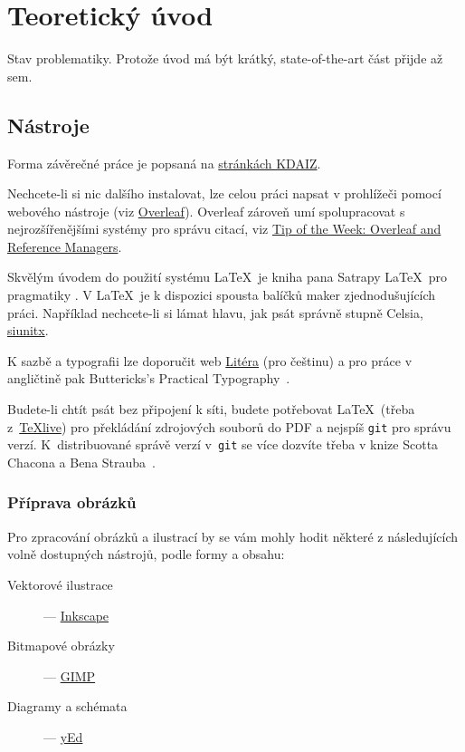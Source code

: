 \chapter{Teoretický úvod}
\label{sec:teorie}

\noindent Stav problematiky. Protože úvod má být krátký, state-of-the-art část přijde až sem.

\section{Nástroje}
\label{sec:nastroje}

Forma závěrečné práce je popsaná na   \href{https://kdaiz.fjfi.cvut.cz/informace/zaverecne-rocnikove-prace/prace-rt-rf.html}{stránkách KDAIZ}.

Nechcete-li si nic dalšího instalovat, lze celou práci napsat v prohlížeči pomocí webového nástroje (viz \href{https://overleaf.com}{Overleaf}). Overleaf zároveň umí spolupracovat s nejrozšířenějšími systémy pro správu citací, viz \href{https://www.overleaf.com/blog/639-tip-of-the-week-overleaf-and-reference-managers}{Tip of the Week: Overleaf and Reference Managers}. 

Skvělým úvodem do použití systému \LaTeX\ je kniha pana Satrapy \LaTeX\ pro pragmatiky \cite{satrapa_latex_2011}.
V \LaTeX\ je k dispozici spousta balíčků maker zjednodušujících práci. Například nechcete-li si lámat hlavu, jak psát správně stupně Celsia,  \href{https://texdoc.org/serve/siunitx/0}{siunitx}.

K sazbě a typografii lze doporučit web \href{http://www.liteera.cz}{Litéra} (pro češtinu) a pro práce v angličtině pak Buttericks's Practical Typography~\cite{butterick_matthew_buttericks_nodate}.

Budete-li chtít psát bez připojení k síti, budete potřebovat \LaTeX\ (třeba z~\href{https://tug.org/texlive/}{TeXlive}) pro překládání zdrojových souborů do PDF a nejspíš \verb?git? pro správu verzí. K~distribuované správě verzí v~\verb?git? se více dozvíte třeba v knize Scotta Chacona a Bena Strauba~\cite{chacon_pro_2014}.

\subsection{Příprava obrázků}
\label{sec:obrazky}

Pro zpracování obrázků a ilustrací by se vám mohly hodit některé z následujících volně dostupných nástrojů, podle formy a obsahu:
\begin{description}
\item[Vektorové ilustrace] --- \href{https://inkscape.org/cs/}{Inkscape}
\item[Bitmapové obrázky] --- \href{https://gimp.org/}{GIMP}
\item[Diagramy a schémata] --- \href{https://www.yworks.com/products/yed}{yEd}
\end{description}

